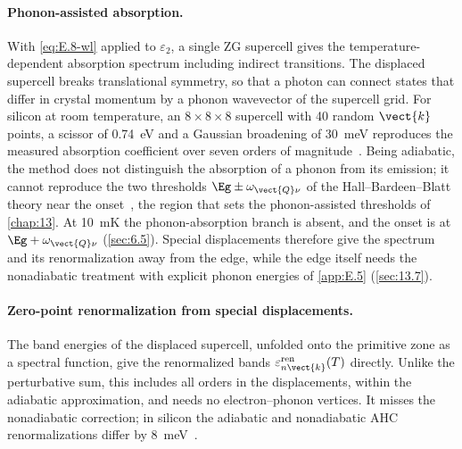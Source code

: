 \paragraph{Phonon-assisted absorption.} With \cref{eq:E.8-wl} applied to $\varepsilon_2$, a single ZG supercell gives the temperature-dependent absorption spectrum including indirect transitions. The displaced supercell breaks translational symmetry, so that a photon can connect states that differ in crystal momentum by a phonon wavevector of the supercell grid. For silicon at room temperature, an $8\times8\times8$ supercell with 40 random $\vect{k}$ points, a scissor of \SI{0.74}{eV} and a Gaussian broadening of \SI{30}{meV} reproduces the measured absorption coefficient over seven orders of magnitude~\cite[Sect.~II and~VII]{zacharias2016one}. Being adiabatic, the method does not distinguish the absorption of a phonon from its emission; it cannot reproduce the two thresholds $\Eg \pm \omega_{\vect{Q}\nu}$ of the Hall--Bardeen--Blatt theory near the onset~\cite[Sect.~II]{zacharias2016one}, the region that sets the phonon-assisted thresholds of \cref{chap:13}. At \SI{10}{mK} the phonon-absorption branch is absent, and the onset is at $\Eg + \omega_{\vect{Q}\nu}$ (\cref{sec:6.5}). Special displacements therefore give the spectrum and its renormalization away from the edge, while the edge itself needs the nonadiabatic treatment with explicit phonon energies of \cref{app:E.5} (\cref{sec:13.7}).

\paragraph{Zero-point renormalization from special displacements.} The band energies of the displaced supercell, unfolded onto the primitive zone as a spectral function, give the renormalized bands $\varepsilon^{\mathrm{ren}}_{n\vect{k}}(T)$ directly. Unlike the perturbative sum, this includes all orders in the displacements, within the adiabatic approximation, and needs no electron--phonon vertices. It misses the nonadiabatic correction; in silicon the adiabatic and nonadiabatic AHC renormalizations differ by \SI{8}{meV}~\cite[Table~VI]{ponce2015temperature}.

